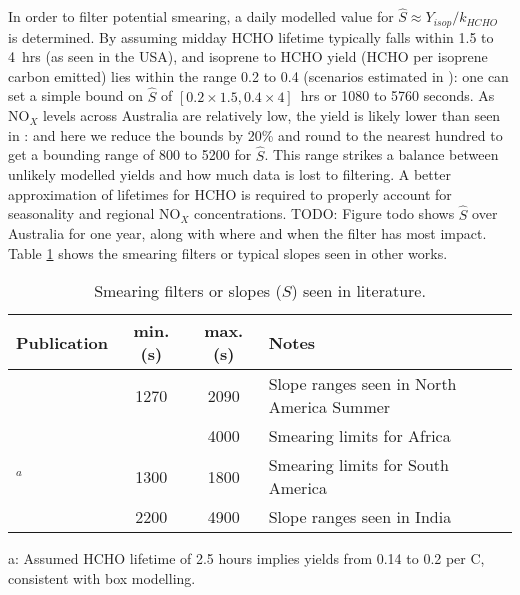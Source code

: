     
    In order to filter potential smearing, a daily modelled value for $\hat{S} \approx Y_{isop}/k_{HCHO}$ is determined.
    By assuming midday HCHO lifetime typically falls within 1.5 to 4~hrs (as seen in the USA), and isoprene to HCHO yield (HCHO per isoprene carbon emitted) lies within the range 0.2 to 0.4 (scenarios estimated in \textcite{Palmer2003}): one can set a simple bound on $\hat{S}$ of $[0.2 \times 1.5, 0.4 \times 4]$~hrs or 1080 to 5760 seconds.
    As NO$_X$ levels across Australia are relatively low, the yield is likely lower than seen in \textcite{Palmer2003}: and here we reduce the bounds by 20\% and round to the nearest hundred to get a bounding range of 800 to 5200 for $\hat{S}$. 
    This range strikes a balance between unlikely modelled yields and how much data is lost to filtering.
    A better approximation of lifetimes for HCHO is required to properly account for seasonality and regional NO$_X$ concentrations.
    TODO: Figure todo shows $\hat{S}$ over Australia for one year, along with where and when the filter has most impact.
    Table \ref{BioIsop:Method:Smearing:tab_smearing_ranges} shows the smearing filters or typical slopes seen in other works.
    
    \begin{table}\begin{threeparttable}
      \caption{Smearing filters or slopes ($S$) seen in literature.}
      \begin{tabular}{ l | c  c  >{\centering\arraybackslash}p{5cm} } 
        \toprule
        Publication & min. (s) & max. (s) & Notes \\
        \midrule
        \textcite{Palmer2003}      & 1270 & 2090 & Slope ranges seen in North America Summer \\
        \textcite{Marais2012}      &      & 4000 & Smearing limits for Africa \\
        \textcite{Barkley2013}$^a$ & 1300 & 1800 & Smearing limits for South America \\
        \textcite{Surl2018}        & 2200 & 4900 & Slope ranges seen in India \\
        
        \bottomrule
      \end{tabular}
      \begin{tablenotes} 
        \item a: Assumed HCHO lifetime of 2.5 hours implies yields from 0.14 to 0.2 per C, consistent with box modelling.
      \end{tablenotes}
      \label{BioIsop:Method:Smearing:tab_smearing_ranges}
    \end{threeparttable}\end{table}
    
